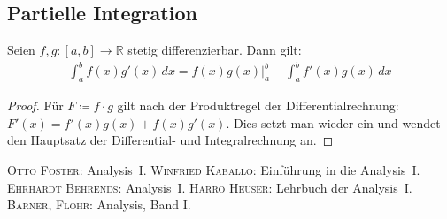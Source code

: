 \documentclass[ngerman,titlepage,twoside, parskip=half*]{scrreprt}
\newcommand*{\R}{\mathbb{R}}
\theoremstyle{break}
\theoremstyle{nonumberbreak}
\newtheorem{proof}{Beweis:}
\begin{document}
\subsection{Partielle Integration}

Seien $f,g\colon[a,b]\rightarrow\R$ stetig differenzierbar. Dann gilt:
\begin{gather*}
  \int_{a}^{b} f(x)g'(x)\,dx= f(x)g(x)\Big|_{a}^{b} -\int_{a}^{b} f'(x)g(x)\,dx
\end{gather*}
\begin{proof}
  Für $F\coloneqq f\cdot g$ gilt nach der Produktregel der
  Differentialrechnung: $F'(x)= f'(x)g(x)+f(x)g'(x)$. Dies setzt man wieder
  ein und wendet den Hauptsatz der Differential- und Integralrechnung an.
\end{proof}

\clearpage
\begin{thebibliography}{99}
 \textsc{Otto Foster}: Analysis~I.
 \textsc{Winfried Kaballo}: Einführung in die Analysis~I.
 \textsc{Ehrhardt Behrends}: Analysis~I.
 \textsc{Harro Heuser}: Lehrbuch der Analysis~I.
 \textsc{Barner}, \textsc{Flohr}: Analysis, Band I.
\end{thebibliography}

\printindex
\end{document}
